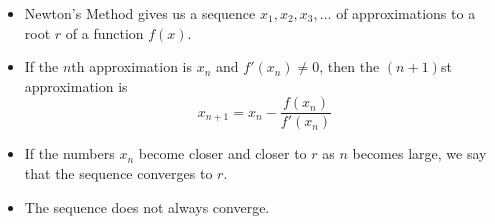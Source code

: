 \begin{frame}
\begin{itemize}
\item  Newton's Method gives us a sequence $x_1, x_2, x_3, \ldots$ of approximations to a root $r$ of a function $f(x)$.
\item  If the $n$th approximation is $x_n$ and $f'(x_n)\neq 0$, then the $(n+1)$st approximation is
\[
x_{n+1} = x_n - \frac{f(x_n)}{f'(x_n)}
\]
\item  If the numbers $x_n$ become closer and closer to $r$ as $n$ becomes large, we say that the sequence converges to $r$.
\item  The sequence does not always converge.
\end{itemize}
\end{frame}
